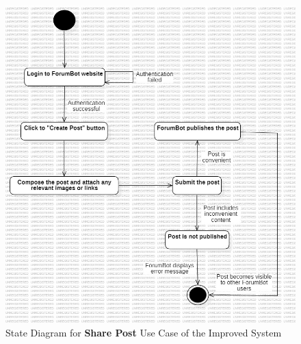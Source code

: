 \begin{figure}[htbp]
    \centering
    \includegraphics[width=1\linewidth]{Figures/share_post_state_diagram.jpg}
    \caption{State Diagram for \textbf{Share Post} Use Case of the Improved System}
    \label{SharePostStateDiagram}
\end{figure}

\newpage

